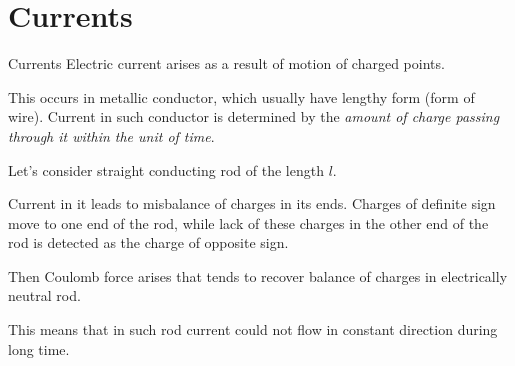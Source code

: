 \documentclass[10pt]{beamer}
\begin{document}
\section{Currents}
\begin{frame}[fragile]{Currents}
Electric current arises as a result of \alert{motion of charged points}.

This occurs in metallic conductor, which usually have lengthy form
(form of wire). Current in such conductor is determined by the
\alert{{\it amount of charge passing through it within the unit of
time}}. 

Let's consider straight conducting rod of the length $l$. 

Current
in it leads to \alert{misbalance of charges in its ends}. Charges of
definite sign move to one end of the rod, while lack of these
charges in the other end of the rod is detected as the charge
of opposite sign. 

Then Coulomb force  arises that
tends to recover balance of charges in electrically neutral
rod. 

This means that in such rod \alert{current could not flow in
constant direction during long time}. 

\end{frame}
\end{document}
